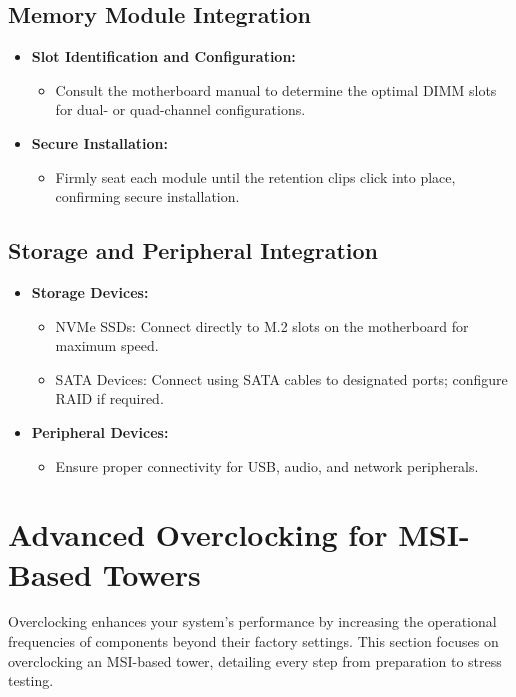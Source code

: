 \documentclass{article}
\begin{document}
\subsection{Memory Module Integration}
\begin{itemize}[itemsep=5pt]
    \item \textbf{Slot Identification and Configuration:}
    \begin{itemize}[label=--]
        \item Consult the motherboard manual to determine the optimal DIMM slots for dual- or quad-channel configurations.
    \end{itemize}
    \item \textbf{Secure Installation:}
    \begin{itemize}[label=--]
        \item Firmly seat each module until the retention clips click into place, confirming secure installation.
    \end{itemize}
\end{itemize}

\subsection{Storage and Peripheral Integration}
\begin{itemize}[itemsep=5pt]
    \item \textbf{Storage Devices:}
    \begin{itemize}[label=--]
        \item NVMe SSDs: Connect directly to M.2 slots on the motherboard for maximum speed.
        \item SATA Devices: Connect using SATA cables to designated ports; configure RAID if required.
    \end{itemize}
    \item \textbf{Peripheral Devices:}
    \begin{itemize}[label=--]
        \item Ensure proper connectivity for USB, audio, and network peripherals.
    \end{itemize}
\end{itemize}

\section{Advanced Overclocking for MSI-Based Towers}
Overclocking enhances your system’s performance by increasing the operational frequencies of components beyond their factory settings. This section focuses on overclocking an MSI-based tower, detailing every step from preparation to stress testing.
\end{document}
